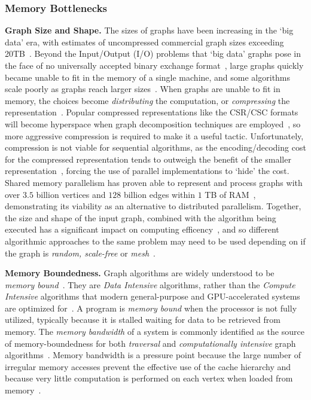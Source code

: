 \subsubsection{Memory Bottlenecks}
\textbf{Graph Size and Shape.} 
The sizes of graphs have been increasing in the `big data' era, with estimates of uncompressed commercial graph sizes exceeding 20TB~\cite{Aananthakrishnan2020}.
Beyond the Input/Output (I/O) problems that `big data' graphs pose in the face of no universally accepted binary exchange format~\cite{Azad2021}, large graphs quickly became unable to fit in the memory of a single machine, and some algorithms scale poorly as graphs reach larger sizes~\cite{Hong2012}.
When graphs are unable to fit in memory, the choices become \textit{distributing} the computation, or \textit{compressing} the representation~\cite{Shun2015, Mccune2015}. 
Popular compressed representations like the CSR/CSC formats will become hyperspace when graph decomposition techniques are employed~\cite{Azad2021}, so more aggressive compression is required to make it a useful tactic.
Unfortunately, compression is not viable for sequential algorithms, as the encoding/decoding cost for the compressed representation tends to outweigh the benefit of the smaller representation~\cite{Shun2015}, forcing the use of parallel implementations to `hide' the cost.
Shared memory parallelism has proven able to represent and process graphs with over $3.5$ billion vertices and $128$ billion edges within $1$ TB of RAM~\cite{Dhulipala2021}, demonstrating its viability as an alternative to distributed parallelism. 
Together, the size and shape of the input graph, combined with the algorithm being executed has a significant impact on computing efficency~\cite{Fu2014, Osama2022}, and so different algorithmic approaches to the same problem may need to be used depending on if the graph is \textit{random, scale-free} or \textit{mesh}~\cite{Lenharth2016}.

\textbf{Memory Boundedness.}
Graph algorithms are widely understood to be \textit{memory bound}~\cite{Beamer2015}. 
They are \textit{Data Intensive} algorithms, rather than the \textit{Compute Intensive} algorithms that modern general-purpose and GPU-accelerated systems are optimized for~\cite{Dysart2016}.
A program is \textit{memory bound} when the processor is not fully utilized, typically because it is stalled waiting for data to be retrieved from memory.
The \textit{memory bandwidth} of a system is commonly identified as the source of memory-boundedness for both \textit{traversal} and \textit{computationally intensive} graph algorithms~\cite{Satish2014}.
Memory bandwidth is a pressure point because the large number of irregular memory accesses prevent the effective use of the cache hierarchy and because very little computation is performed on each vertex when loaded from memory~\cite{Ahn2015}.

